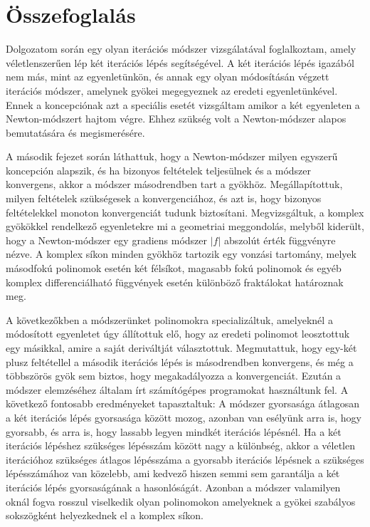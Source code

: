 \documentclass[a4paper,12pt]{report}
\begin{document}











\chapter{Összefoglalás}
Dolgozatom során egy olyan iterációs módszer vizsgálatával foglalkoztam, amely véletlenszerűen lép két iterációs lépés segítségével. A két iterációs lépés igazából nem más, mint az egyenletünkön, és annak egy olyan módosításán végzett iterációs módszer, amelynek gyökei megegyeznek az eredeti egyenletünkével. Ennek a koncepciónak azt a speciális esetét vizsgáltam amikor a két egyenleten a Newton-módszert hajtom végre. Ehhez szükség volt a Newton-módszer alapos bemutatására és megismerésére.

A második fejezet során láthattuk, hogy a Newton-módszer milyen egyszerű koncepción alapszik, és ha bizonyos feltételek teljesülnek és a módszer konvergens, akkor a módszer másodrendben tart a gyökhöz. Megállapítottuk, milyen feltételek szükségesek a konvergenciához, és azt is, hogy bizonyos feltételekkel monoton konvergenciát tudunk biztosítani. Megvizsgáltuk, a komplex gyökökkel rendelkező egyenletekre mi a geometriai meggondolás, melyből kiderült, hogy a Newton-módszer egy gradiens módszer $|f|$ abszolút érték függvényre nézve. A komplex síkon minden gyökhöz tartozik egy vonzási tartomány, melyek másodfokú polinomok esetén két félsíkot, magasabb fokú polinomok és egyéb komplex differenciálható függvények esetén különböző fraktálokat határoznak meg.

A következőkben a módszerünket polinomokra specializáltuk, amelyeknél a módosított egyenletet úgy állítottuk elő, hogy az eredeti polinomot leosztottuk egy másikkal, amire a saját deriváltját választottuk. Megmutattuk, hogy egy-két plusz feltétellel a második iterációs lépés is másodrendben konvergens, és még a többszörös gyök sem biztos, hogy megakadályozza a konvergenciát. Ezután a módszer elemzéséhez általam írt számítógépes programokat használtunk fel. A következő fontosabb eredményeket tapasztaltuk: A módszer gyorsasága átlagosan a két iterációs lépés gyorsasága között mozog, azonban van esélyünk arra is, hogy gyorsabb, és arra is, hogy lassabb legyen mindkét iterációs lépésnél. Ha a két iterációs lépéshez szükséges lépésszám között nagy a különbség, akkor a véletlen iterációhoz szükséges átlagos lépésszáma a gyorsabb iterációs lépésnek a szükséges lépésszámához van közelebb, ami kedvező hiszen semmi sem garantálja a két iterációs lépés gyorsaságának a hasonlóságát. Azonban a módszer valamilyen oknál fogva rosszul viselkedik olyan polinomokon amelyeknek a gyökei szabályos sokszögként helyezkednek el a komplex síkon.
\end{document}
